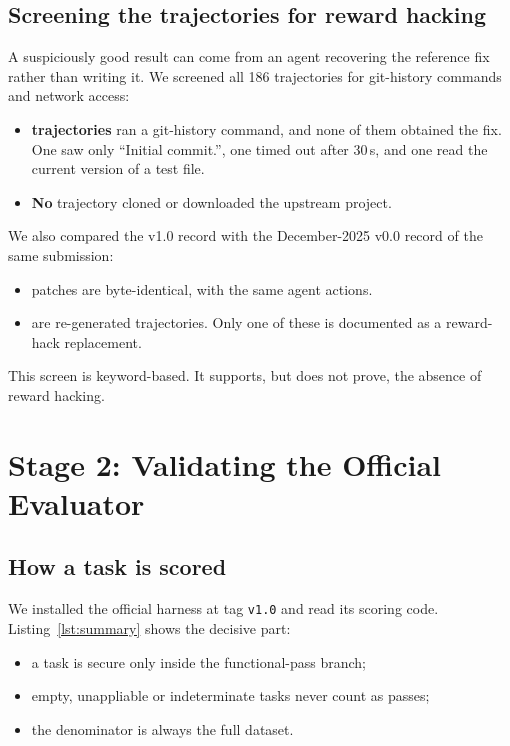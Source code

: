 \documentclass[11pt,a4paper]{article}
\begin{document}
\subsection{Screening the trajectories for reward hacking}
A suspiciously good result can come from an agent recovering the reference fix rather than writing it. We
screened all 186 trajectories for git-history commands and network access:
\begin{itemize}[nosep]
  \item \textbf{\GitCmdTasks{} trajectories} ran a git-history command, and none of them obtained the fix. One saw
  only ``Initial commit.'', one timed out after 30\,s, and one read the current version of a test file.
  \item \textbf{No} trajectory cloned or downloaded the upstream project.
\end{itemize}

We also compared the v1.0 record with the December-2025 v0.0 record of the same submission:
\begin{itemize}[nosep]
  \item \SamePatchCount{} patches are byte-identical, with the same agent actions.
  \item \DiffPatchCount{} are re-generated trajectories. Only one of these is documented as a reward-hack
  replacement.
\end{itemize}
This screen is keyword-based. It supports, but does not prove, the absence of reward hacking.

\section{Stage 2: Validating the Official Evaluator}
\label{sec:evaluator}
\subsection{How a task is scored}
We installed the official harness at tag \texttt{v1.0} and read its scoring code. Listing~\ref{lst:summary}
shows the decisive part:
\begin{itemize}[nosep]
  \item a task is secure only inside the functional-pass branch;
  \item empty, unappliable or indeterminate tasks never count as passes;
  \item the denominator is always the full dataset.
\end{itemize}
\end{document}
